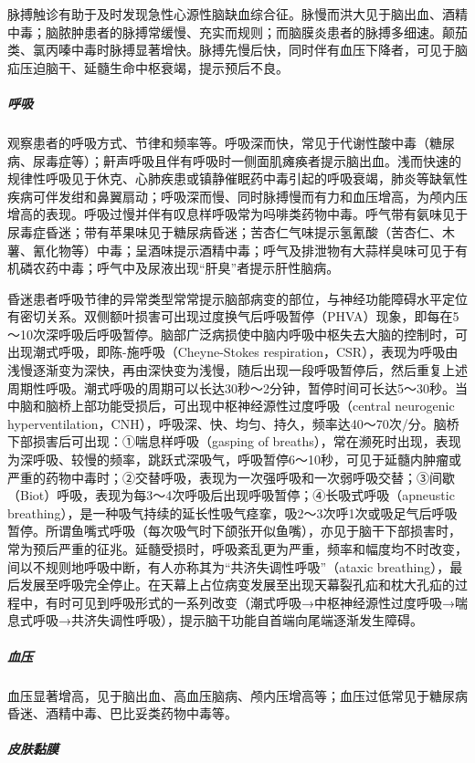 脉搏触诊有助于及时发现急性心源性脑缺血综合征。脉慢而洪大见于脑出血、酒精中毒；脑脓肿患者的脉搏常缓慢、充实而规则；而脑膜炎患者的脉搏多细速。颠茄类、氯丙嗪中毒时脉搏显著增快。脉搏先慢后快，同时伴有血压下降者，可见于脑疝压迫脑干、延髓生命中枢衰竭，提示预后不良。

\subparagraph{呼吸}

观察患者的呼吸方式、节律和频率等。呼吸深而快，常见于代谢性酸中毒（糖尿病、尿毒症等）；鼾声呼吸且伴有呼吸时一侧面肌瘫痪者提示脑出血。浅而快速的规律性呼吸见于休克、心肺疾患或镇静催眠药中毒引起的呼吸衰竭，肺炎等缺氧性疾病可伴发绀和鼻翼扇动；呼吸深而慢、同时脉搏慢而有力和血压增高，为颅内压增高的表现。呼吸过慢并伴有叹息样呼吸常为吗啡类药物中毒。呼气带有氨味见于尿毒症昏迷；带有苹果味见于糖尿病昏迷；苦杏仁气味提示氢氰酸（苦杏仁、木薯、氰化物等）中毒；呈酒味提示酒精中毒；呼气及排泄物有大蒜样臭味可见于有机磷农药中毒；呼气中及尿液出现“肝臭”者提示肝性脑病。

昏迷患者呼吸节律的异常类型常常提示脑部病变的部位，与神经功能障碍水平定位有密切关系。双侧额叶损害可出现过度换气后呼吸暂停（PHVA）现象，即每在5～10次深呼吸后呼吸暂停。脑部广泛病损使中脑内呼吸中枢失去大脑的控制时，可出现潮式呼吸，即陈-施呼吸（Cheyne-Stokes
respiration，CSR），表现为呼吸由浅慢逐渐变为深快，再由深快变为浅慢，随后出现一段呼吸暂停后，然后重复上述周期性呼吸。潮式呼吸的周期可以长达30秒～2分钟，暂停时间可长达5～30秒。当中脑和脑桥上部功能受损后，可出现中枢神经源性过度呼吸（central
neurogenic
hyperventilation，CNH），呼吸深、快、均匀、持久，频率达40～70次/分。脑桥下部损害后可出现：①喘息样呼吸（gasping
of
breaths），常在濒死时出现，表现为深呼吸、较慢的频率，跳跃式深吸气，呼吸暂停6～10秒，可见于延髓内肿瘤或严重的药物中毒时；②交替呼吸，表现为一次强呼吸和一次弱呼吸交替；③间歇（Biot）呼吸，表现为每3～4次呼吸后出现呼吸暂停；④长吸式呼吸（apneustic
breathing），是一种吸气持续的延长性吸气痉挛，吸2～3次呼1次或吸足气后呼吸暂停。所谓鱼嘴式呼吸（每次吸气时下颌张开似鱼嘴），亦见于脑干下部损害时，常为预后严重的征兆。延髓受损时，呼吸紊乱更为严重，频率和幅度均不时改变，间以不规则地呼吸中断，有人亦称其为“共济失调性呼吸”（ataxic
breathing），最后发展至呼吸完全停止。在天幕上占位病变发展至出现天幕裂孔疝和枕大孔疝的过程中，有时可见到呼吸形式的一系列改变（潮式呼吸→中枢神经源性过度呼吸→喘息式呼吸→共济失调性呼吸），提示脑干功能自首端向尾端逐渐发生障碍。

\subparagraph{血压}

血压显著增高，见于脑出血、高血压脑病、颅内压增高等；血压过低常见于糖尿病昏迷、酒精中毒、巴比妥类药物中毒等。

\subparagraph{皮肤黏膜}


